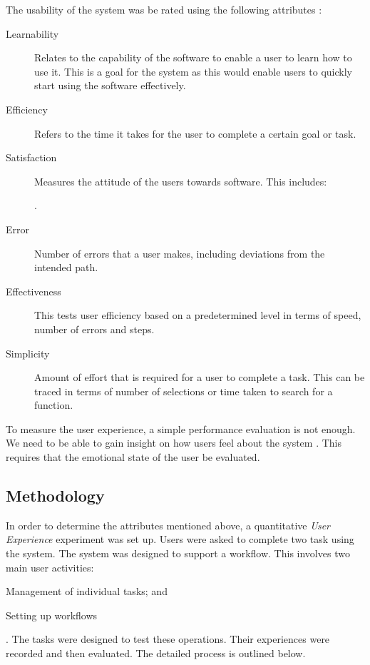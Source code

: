The usability of the system was be rated using the following attributes
\cite{doi:10.1207/s15327590ijhc1803_3}:
\begin{description}
\item[Learnability] Relates to the capability of the software to enable a user
    to learn how to use it. This is a goal for the system as this would
    enable users to quickly start using the software effectively.
\item[Efficiency] Refers to the time it takes for the
    user to complete a certain goal or task.
\item[Satisfaction] Measures the attitude of the users towards software. This
    includes: .

\item[Error] Number of errors that a user makes, including deviations from
    the intended path.
\item[Effectiveness] This tests user efficiency based on a predetermined level
    in terms of speed, number of errors and steps.
\item[Simplicity] Amount of effort that is required for a user to complete a
    task. This can be traced in terms of number of selections or time taken to
    search for a function.
\end{description}

To measure the user experience, a simple performance evaluation is not
enough. We need to be able to gain insight on how users feel about the system
\cite{vermeeren2010user}. This requires that the emotional state of the user be
evaluated.

\subsection{Methodology}
In order to determine the attributes mentioned above, a quantitative \emph{User Experience}
 experiment was set up. Users were asked to complete two task using
the system. The system was designed to support a workflow. This involves two main
user activities: \begin{inparaenum}[(i)] \item Management of individual tasks;
and \item Setting up workflows \end{inparaenum}. The tasks were designed to test
these operations. Their experiences were recorded and then evaluated. The detailed
process is outlined below.

